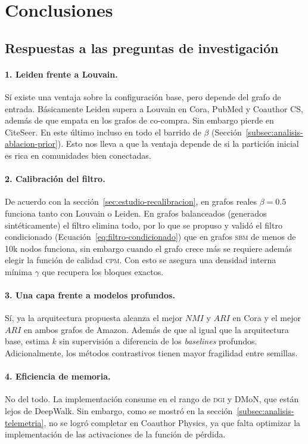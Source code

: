 \documentclass[twoside,twocolumn,10pt]{article}
\begin{document}
\section{Conclusiones}
\label{sec:conclusiones}
\fontsize{10}{12}\selectfont

\subsection{Respuestas a las preguntas de investigación}

\paragraph{1. Leiden frente a Louvain.}
Sí existe una ventaja sobre la configuración base, pero depende del grafo de entrada. Básicamente Leiden supera a Louvain en Cora, PubMed y Coauthor CS, además de que empata en los grafos de co-compra. Sin embargo pierde en CiteSeer. En este último incluso en todo el barrido de $\beta$ (Sección~\ref{subsec:analisis-ablacion-prior}). Esto nos lleva a que la ventaja depende de si la partición inicial es rica en comunidades bien conectadas.

\paragraph{2. Calibración del filtro.}
De acuerdo con la sección~\ref{sec:estudio-recalibracion}, en grafos reales $\beta = 0.5$ funciona tanto con Louvain o Leiden. En grafos balanceados (generados sintéticamente) el filtro elimina todo, por lo que se propuso y validó el filtro condicionado (Ecuación~\ref{eq:filtro-condicionado}) que en grafos \textsc{sbm} de menos de 10k nodos funciona, sin embargo cuando el grafo crece más se requiere además elegir la función de calidad \textsc{cpm}. Con esto se asegura una densidad interna mínima $\gamma$
 que recupera los bloques exactos.

\paragraph{3. Una capa frente a modelos profundos.}
Sí, ya la arquitectura propuesta alcanza el mejor $NMI$ y $ARI$ en Cora y el mejor $ARI$ en ambos grafos de Amazon. Además de que al igual que la arquitectura base, estima $k$ sin supervisión a diferencia de los  \textit{baselines} profundos. Adicionalmente, los métodos contrastivos tienen mayor fragilidad entre semillas.

\paragraph{4. Eficiencia de memoria.}
No del todo. La implementación consume en el rango de \textsc{dgi} y DMoN, que están lejos de DeepWalk.
Sin embargo, como se mostró en la sección~\ref{subsec:analisis-telemetria}, no se logró completar en Coauthor Physics, ya que falta optimizar la implementación de las activaciones de la función de pérdida.
\end{document}
